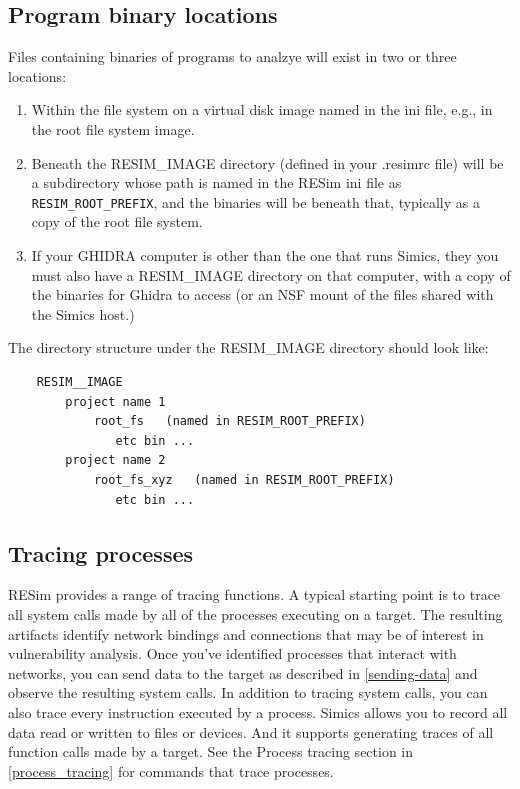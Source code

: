 \documentclass[titlepage]{article}
\begin{document}
\subsection{Program binary locations}
\label{program-binaries}
Files containing binaries of programs to analzye will exist in two or three locations:
\begin{enumerate}
\item Within the file system on a virtual disk image named in the ini file, e.g., in the root file system image.
\item Beneath the RESIM\_IMAGE directory (defined in your .resimrc file) will be a subdirectory whose path is named in the
RESim ini file as {\tt RESIM\_ROOT\_PREFIX}, and the binaries will be beneath that, typically as a copy of the root file system.
\item If your GHIDRA computer is other than the one that runs Simics, they you must also have a RESIM\_IMAGE directory on that
computer, with a copy of the binaries for Ghidra to access (or an NSF mount of the files shared with the Simics host.)
\end{enumerate}

The directory structure under the RESIM\_IMAGE directory should look like:
\begin{verbatim}
    RESIM__IMAGE
        project name 1
            root_fs   (named in RESIM_ROOT_PREFIX)
               etc bin ...
        project name 2
            root_fs_xyz   (named in RESIM_ROOT_PREFIX)
               etc bin ...
\end{verbatim}


\subsection{Tracing processes}
RESim provides a range of tracing functions.  A typical starting point is to trace all system calls made by all of the processes executing on a target.
The resulting artifacts identify network bindings and connections that may be of interest in vulnerability analysis.  Once you've identified processes
that interact with networks, you can send data to the target as described in \ref{sending-data} and observe the resulting system calls.  In addition to 
tracing system calls, you can also trace every instruction executed by a process. Simics allows you to record all data read or written to files or devices.
And it supports generating traces of all function calls made by a target.  See the Process tracing section in \ref{process_tracing} for commands that trace processes.
\end{document}
